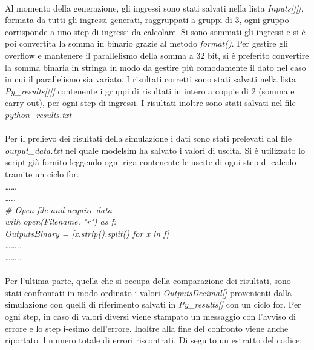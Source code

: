 \\
Al momento della generazione, gli ingressi sono stati salvati nella lista \textit{Inputs[][]}, formata da tutti gli ingressi  generati, raggruppati a gruppi di 3, ogni gruppo corrisponde a uno step di ingressi da calcolare. Si sono sommati gli ingressi e si è poi convertita la somma in binario grazie al metodo \textit{format()}. Per gestire gli overflow e mantenere il parallelismo della somma a 32 bit, si è preferito convertire la somma binaria in stringa in modo da gestire più comodamente il dato nel caso in cui il parallelismo sia variato.
I risultati corretti sono stati salvati nella lista \textit{Py\_results[][]} contenente i gruppi di risultati in intero a coppie di 2 (somma e carry-out), per ogni step di ingressi. I risultati inoltre sono stati salvati nel file \textit{python\_results.txt}\\
\\
Per il prelievo dei risultati della simulazione i dati sono stati prelevati dal file \textit{output\_data.txt} nel quale modelsim ha salvato i valori di uscita. Si è utilizzato lo script già fornito leggendo ogni riga contenente le uscite di ogni step di calcolo tramite un ciclo for.\\ 
\textit{……\\
…..\\
\# Open file and acquire data\\
with open(Filename, "r") as f:\\
\hspace*{1cm}OutputsBinary = [x.strip().split() for x in f]\\
……..\\
……..}\\
\\
Per l’ultima parte, quella che si occupa della comparazione dei risultati, sono stati confrontati in modo ordinato i valori \textit{OutputsDecimal[]} provenienti dalla simulazione con quelli di riferimento salvati in \textit{Py\_results[]} con un ciclo for. Per ogni step, in caso di valori diversi viene stampato un messaggio con l’avviso di errore e lo step i-esimo dell’errore. Inoltre alla fine del confronto viene anche riportato il numero totale di errori riscontrati. Di seguito un estratto del codice:\\
\\
